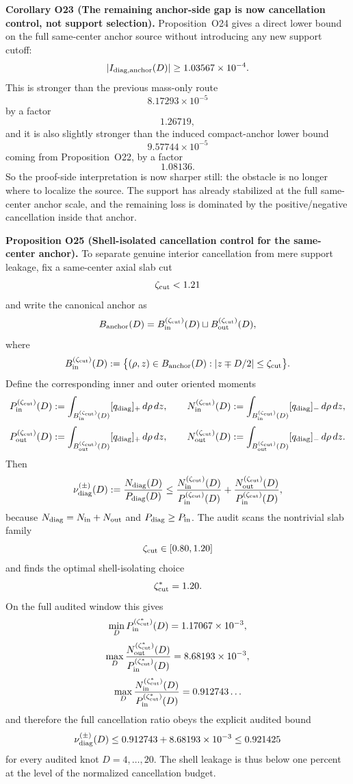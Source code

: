 \documentclass[aps,prd,onecolumn,notitlepage,nofootinbib,superscriptaddress,11pt,floatfix]{revtex4-2}
\begin{document}
\medskip\noindent\textbf{Corollary O23 (The remaining anchor-side gap is now cancellation control, not support selection).}
Proposition~O24 gives a direct lower bound on the full same-center anchor source without introducing any new support cutoff:
\[
|I_{\rm diag,anchor}(D)|
\ge
1.03567\times10^{-4}.
\]
This is stronger than the previous mass-only route
\[
8.17293\times10^{-5}
\]
by a factor
\[
1.26719,
\]
and it is also slightly stronger than the induced compact-anchor lower bound
\[
9.57744\times10^{-5}
\]
coming from Proposition~O22, by a factor
\[
1.08136.
\]
So the proof-side interpretation is now sharper still: the obstacle is no longer where to localize the source. The support has already stabilized at the full same-center anchor scale, and the remaining loss is dominated by the positive/negative cancellation inside that anchor.

\medskip\noindent\textbf{Proposition O25 (Shell-isolated cancellation control for the same-center anchor).}
To separate genuine interior cancellation from mere support leakage, fix a same-center axial slab cut
\[
\zeta_{\rm cut}<1.21
\]
and write the canonical anchor as
\[
B_{\rm anchor}(D)=B_{\rm in}^{(\zeta_{\rm cut})}(D)\sqcup B_{\rm out}^{(\zeta_{\rm cut})}(D),
\]
where
\[
B_{\rm in}^{(\zeta_{\rm cut})}(D)
:=
\bigl\{(\rho,z)\in B_{\rm anchor}(D): |z\mp D/2|\le \zeta_{\rm cut}\bigr\}.
\]
Define the corresponding inner and outer oriented moments
\[
P_{\rm in}^{(\zeta_{\rm cut})}(D):=\int_{B_{\rm in}^{(\zeta_{\rm cut})}(D)} [q_{\rm diag}]_+\,d\rho\,dz,
\qquad
N_{\rm in}^{(\zeta_{\rm cut})}(D):=\int_{B_{\rm in}^{(\zeta_{\rm cut})}(D)} [q_{\rm diag}]_-\,d\rho\,dz,
\]
\[
P_{\rm out}^{(\zeta_{\rm cut})}(D):=\int_{B_{\rm out}^{(\zeta_{\rm cut})}(D)} [q_{\rm diag}]_+\,d\rho\,dz,
\qquad
N_{\rm out}^{(\zeta_{\rm cut})}(D):=\int_{B_{\rm out}^{(\zeta_{\rm cut})}(D)} [q_{\rm diag}]_-\,d\rho\,dz.
\]
Then
\[
\nu_{\rm diag}^{(\pm)}(D)
:=
\frac{N_{\rm diag}(D)}{P_{\rm diag}(D)}
\le
\frac{N_{\rm in}^{(\zeta_{\rm cut})}(D)}{P_{\rm in}^{(\zeta_{\rm cut})}(D)}
+
\frac{N_{\rm out}^{(\zeta_{\rm cut})}(D)}{P_{\rm in}^{(\zeta_{\rm cut})}(D)},
\]
because \(N_{\rm diag}=N_{\rm in}+N_{\rm out}\) and \(P_{\rm diag}\ge P_{\rm in}\).
The audit 
scans the nontrivial slab family
\[
\zeta_{\rm cut}\in[0.80,1.20]
\]
and finds the optimal shell-isolating choice
\[
\zeta_{\rm cut}^{\ast}=1.20.
\]
On the full audited window this gives
\[
\min_D P_{\rm in}^{(\zeta_{\rm cut}^{\ast})}(D)=1.17067\times10^{-3},
\]
\[
\max_D \frac{N_{\rm out}^{(\zeta_{\rm cut}^{\ast})}(D)}{P_{\rm in}^{(\zeta_{\rm cut}^{\ast})}(D)}
=
8.68193\times10^{-3},
\]
\[
\max_D \frac{N_{\rm in}^{(\zeta_{\rm cut}^{\ast})}(D)}{P_{\rm in}^{(\zeta_{\rm cut}^{\ast})}(D)}
=
0.912743\ldots
\]
and therefore the full cancellation ratio obeys the explicit audited bound
\[
\nu_{\rm diag}^{(\pm)}(D)
\le
0.912743 + 8.68193\times10^{-3}
\le
0.921425
\]
for every audited knot \(D=4,\dots,20\). The shell leakage is thus below one percent at the level of the normalized cancellation budget.
\end{document}
